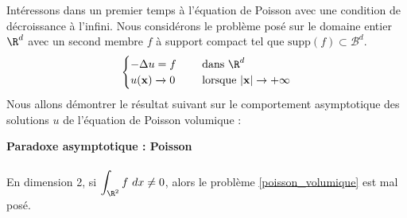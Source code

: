 Intéressons dans un premier temps à l'équation de Poisson avec une condition de décroissance à l'infini. Nous considérons le problème posé sur le domaine entier $\R^d$ avec un second membre $f$ à support compact tel que $\text{supp}(f) \subset \mathscr{B}^d$.
\begin{align}
    \begin{cases}
    -\Delta u = f \quad &\text{ dans } \R^d \\  \label{poisson_volumique}
    u(\mathbf{x}) \xrightarrow[]{} 0 &\text{ lorsque } |\mathbf{x}| \to +\infty
\end{cases}
\end{align}
Nous allons démontrer le résultat suivant sur le comportement asymptotique des solutions $u$ de l'équation de Poisson volumique :
\begin{propositionbox}
    \begin{proposition}\textbf{Paradoxe asymptotique : Poisson}\\
        \\
        En dimension 2, si $\displaystyle \int_{\R^2} f \ dx  \neq 0$, alors le problème \ref{poisson_volumique} est mal posé.
    \end{proposition}
\end{propositionbox}
